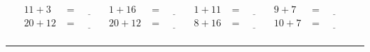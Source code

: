 \documentclass{article}
\begin{document}
\begin{sloppy}
\begin{align*}
    {11} + {3} &= \underline{\hspace{1cm}} & {1} + {16} &= \underline{\hspace{1cm}} & {1} + {11} &= \underline{\hspace{1cm}} & {9} + {7} &= \underline{\hspace{1cm}} \\
    {20} + {12} &= \underline{\hspace{1cm}} & {20} + {12} &= \underline{\hspace{1cm}} & {8} + {16} &= \underline{\hspace{1cm}} & {10} + {7} &= \underline{\hspace{1cm}} \\
\end{align*}
\hrule
\end{sloppy}
\end{document}
